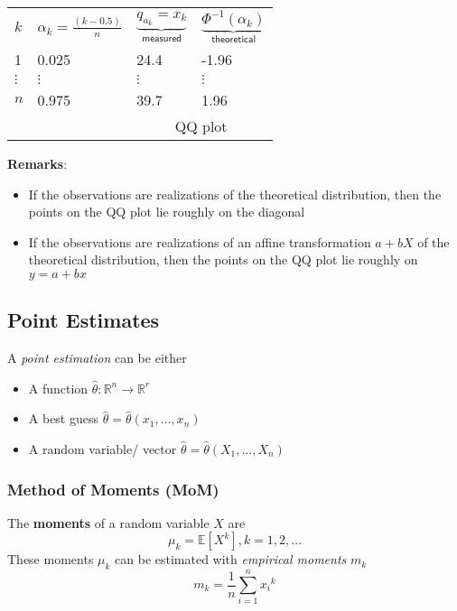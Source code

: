 \renewcommand{\arraystretch}{1.3}
\setlength{\oldtabcolsep}{\tabcolsep}\setlength\tabcolsep{12pt}
\begin{tabularx}{\linewidth}{@{}llll@{}}
    $k$      & $\alpha_k = \frac{(k-0.5)}{n}$ & $\underbrace{q_{a_k} = x_k}_{\textsf{measured}}$ & $\underbrace{\Phi^{-1}(\alpha_k)}_{\textsf{theoretical}}$ \\
    \cmidrule{2-4}
    1        & 0.025                          & 24.4                                             & -1.96                                                     \\
    $\vdots$ & $\vdots$                       & $\vdots$                                         & $\vdots$                                                  \\
    $n$      & 0.975                          & 39.7                                             & 1.96                                                      \\
    \cmidrule{3-4}
             &                                & \multicolumn{2}{c}{QQ plot}
\end{tabularx}
\renewcommand{\arraystretch}{1}
\setlength\tabcolsep{\oldtabcolsep}

\textbf{Remarks}:
\begin{itemize}
    \item If the observations are realizations of the theoretical distribution, then the points on the QQ plot lie roughly on the diagonal
    \item If the observations are realizations of an affine transformation $a+bX$ of the theoretical distribution, then the points on the QQ plot lie roughly on $y = a+bx$
\end{itemize}

\subsection{Point Estimates}
A \textit{point estimation} can be either
\begin{itemize}
    \item A function $\hat{\theta}: \mathbb{R}^n\to \mathbb{R}^r$
    \item A best guess $\hat{\theta} = \hat{\theta}(x_1,\ldots, x_n)$
    \item A random variable/ vector $\hat{\theta} = \hat{\theta}(X_1,\ldots, X_n)$
\end{itemize}

\subsubsection{Method of Moments (MoM)}
The \textbf{moments} of a random variable $X$ are
\noindent\begin{equation*}
    \mu_k=\mathbb{E}[X^k],k=1,2,\ldots
\end{equation*}
These moments $\mu_k$ can be estimated with \textit{empirical moments} $m_k$
\noindent\begin{equation*}
    m_k=\frac{1}{n}\sum_{i=1}^n {x_i}^k
\end{equation*}


